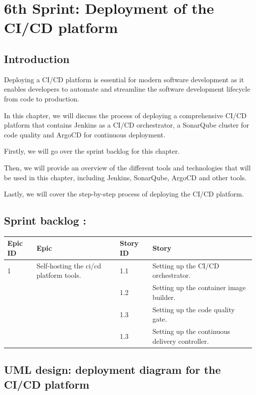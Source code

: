 \graphicspath{{./assets/}}
\setcounter{mtc}{5}
\chapter{ 6th Sprint: Deployment of the CI/CD platform }

\minitoc
\newpage
\section*{Introduction}
Deploying a CI/CD platform is essential for modern software development as it enables developers to automate and streamline the software development lifecycle from code to production. 

In this chapter, we will discuss the process of deploying a comprehensive CI/CD platform that contains Jenkins as a CI/CD orchestrator, a SonarQube cluster for code quality and ArgoCD for continuous deployment. 

Firstly, we will go over the sprint backlog for this chapter. 

Then, we will provide an overview of the different tools and technologies that will be used in this chapter, including Jenkins, SonarQube, ArgoCD and other tools. 

Lastly, we will cover the step-by-step process of deploying the CI/CD platform. 

\section{Sprint backlog :}

\begin{longtable}[H]{|m{1.5cm}|m{3cm}|m{1.5cm}|m{9cm}|}
\hline
{\textbf{Epic ID}} & {\textbf{Epic}} & {\textbf{Story ID}} & {\textbf{Story}}\\
\hline
1  & Self-hosting the ci/cd platform tools.  &  1.1	 & Setting up the CI/CD orchestrator.\\
\cline{3-4}
& & 1.2 & Setting up the container image builder. \\
\cline{3-4}
& & 1.3	& Setting up the code quality gate. \\
\cline{3-4}
& & 1.3	& Setting up the continuous delivery controller. \\
\cline{3-4}
\hline
\end{longtable}

\section{UML design: deployment diagram for the CI/CD platform} 

